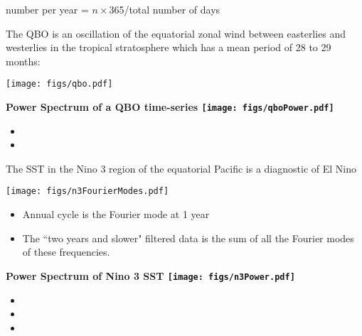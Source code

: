 number per year = $n\times$365/total number of days

\clearpage
{}

The QBO is an oscillation of the equatorial zonal wind between easterlies and westerlies in the tropical stratosphere which has a mean period of 28 to 29 months:

\texttt{[image: figs/qbo.pdf]}


\begin{minipage}{0.6\linewidth}\centering\bf
Power Spectrum of a QBO time-series
\texttt{[image: figs/qboPower.pdf]}
\end{minipage}
\hfill
\begin{minipage}{0.38\linewidth}\raggedright
\begin{itemize}
\item {}
\item {}
\end{itemize}
\end{minipage}

\clearpage
{}

The SST in the Nino 3 region of the equatorial Pacific is a diagnostic of El Nino

\begin{minipage}{0.7\linewidth}
\texttt{[image: figs/n3FourierModes.pdf]}
\end{minipage}
\hfill
\begin{minipage}{0.29\linewidth}\raggedright\begin{itemize}
\item Annual cycle is the Fourier mode at 1 year
\item The ``two years and slower" filtered data is the sum of all the Fourier modes of these frequencies.
\end{itemize}\end{minipage}

\begin{minipage}{0.5\linewidth}\centering\bf
Power Spectrum of Nino 3 SST
\texttt{[image: figs/n3Power.pdf]}
\end{minipage}
\hfill
\begin{minipage}{0.48\linewidth}\raggedright
\begin{itemize}
\item {}
\item {}
\item {}
\end{itemize}
\end{minipage}

